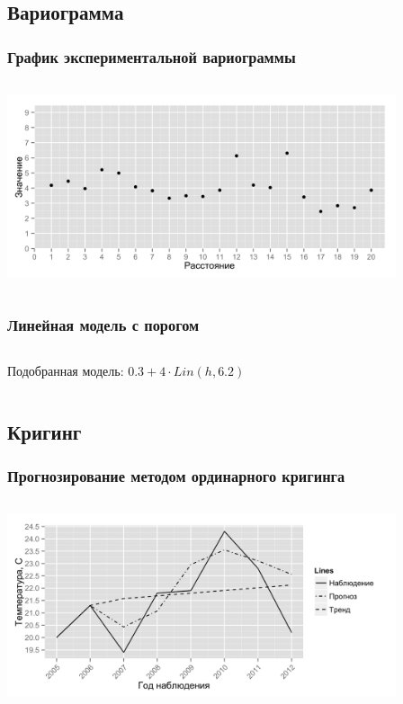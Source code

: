 \documentclass[10pt, pdf,aspectratio=169]{beamer}
\begin{document}
\subsection{Вариограмма}

\begin{frame}
  \frametitle{График экспериментальной вариограммы}   %
   \begin{columns}[c]
   \column{4.5in}
  \includegraphics[width=4.5in]{../../figures/variogram/lin-variogram.png}
  \end{columns}
\end{frame}

\begin{frame}
  \frametitle{Линейная модель с порогом}   %
  \begin{columns}[c]
  \column{2in}  %
  Подобранная модель: $ 0.3 + 4 \cdot Lin(h, 6.2) $
  \column{3in}
  \end{columns}
\end{frame}

\subsection{Кригинг}
\begin{frame}
  \frametitle{Прогнозирование методом ординарного кригинга}   %
   \begin{columns}[c]
   \column{4.5in}
   \includegraphics[width=4.5in]{../../figures/variogram/lin-fit-adapt-cross-prediction.png}
  \end{columns}
\end{frame}
\end{document}
